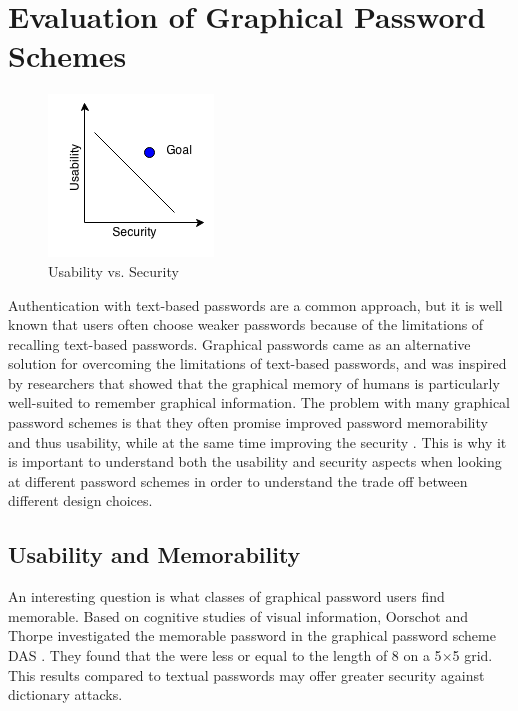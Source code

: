 \section{Evaluation of Graphical Password Schemes}

  \begin{figure}
    \vspace{-20pt}
    \begin{center}
      \includegraphics[scale=0.7]{pics/UsabilityVsSecurity.png}
    \end{center}
    \vspace{-20pt}
    \caption{Usability vs. Security}
    \vspace{-10pt}
  \end{figure}

  Authentication with text-based passwords are a common approach, but it is well known that users often choose weaker passwords because of the limitations of recalling text-based passwords. Graphical passwords came as an alternative solution for overcoming the limitations of text-based passwords, and was inspired by researchers that showed that the graphical memory of humans is particularly well-suited to remember graphical information\cite{DeAngeli}. The problem with many graphical password schemes is that they often promise improved password memorability and thus usability, while at the same time improving the security \cite{Biddle}. This is why it is important to understand both the usability and security aspects when looking at different password schemes in order to understand the trade off between different design choices.

\subsection{Usability and Memorability}


  An interesting question is what classes of graphical password users find memorable. Based on cognitive studies of visual information, Oorschot and Thorpe \cite{Thorpe} investigated the memorable password in the graphical password scheme DAS \cite{Jermyn}. They found that the were less or equal to the length of 8 on a 5$\times$5 grid. This results compared to textual passwords may offer greater security against dictionary attacks. 

